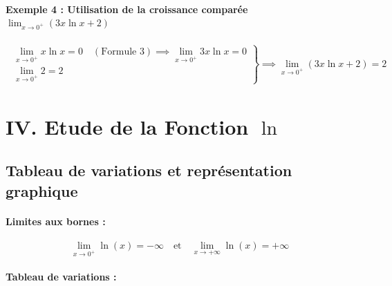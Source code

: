 \documentclass[12pt,a4paper]{article}
\begin{document}
\begin{tcolorbox}[colback=gray!5!white,colframe=myblue,title=\textbf{Exemples d'application}]
\vspace{0.3cm}

\paragraph{Exemple 4 : Utilisation de la croissance comparée $\lim_{x \to 0^+} (3x\ln x + 2)$}
\[
\begin{aligned}
\left.
\begin{array}{l}
\lim_{x \to 0^+} x\ln x = 0 \quad (\text{Formule 3}) \implies \lim_{x \to 0^+} 3x\ln x = 0 \\[2mm]
\lim_{x \to 0^+} 2 = 2
\end{array}
\right\} 
&\implies \lim_{x \to 0^+} (3x\ln x + 2) = 2
\end{aligned}
\]

\end{tcolorbox}

\section*{\color{myred}IV. Etude de la Fonction $\ln$}

\subsection*{\color{myred} Tableau de variations et représentation graphique}

\paragraph{Limites aux bornes :}
\[
\lim_{x \to 0^+} \ln(x) = -\infty \quad \text{et} \quad \lim_{x \to +\infty} \ln(x) = +\infty
\]

\paragraph{Tableau de variations :}

\begin{center}
\end{center}
\end{document}
